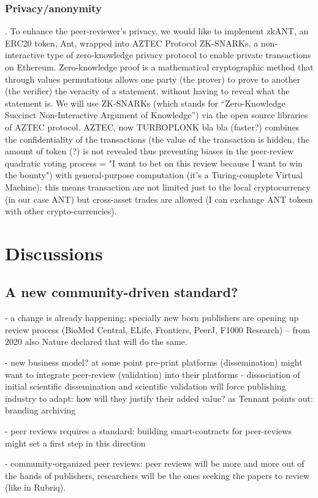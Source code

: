 \documentclass[runningheads]{llncs}
\begin{document}
\subsubsection{Privacy/anonymity}. To enhance the peer-reviewer's privacy, we would like to implement zkANT, an ERC20 token, Ant, wrapped into AZTEC Protocol ZK-SNARKs, a non-interactive type of zero-knowledge privacy protocol to enable private transactions on Ethereum. Zero-knowledge proof is a mathematical cryptographic method that through values permutations allows one party (the prover) to prove to another (the verifier) the veracity of a statement, without having to reveal what the statement is. We will use ZK-SNARKs (which stands for “Zero-Knowledge Succinct Non-Interactive Argument of Knowledge”) via the open source libraries of AZTEC protocol. AZTEC, now TURBOPLONK bla bla (faster?) combines the confidentiality of the transactions (the value of the transaction is hidden, the amount of token (?) is not revealed thus preventing biases in the peer-review quadratic voting process = "I want to bet on this review because I want to win the bounty") with general-purpose computation (it's a Turing-complete Virtual Machine): this means transaction are not limited just to the local cryptocurrency (in our case ANT) but cross-asset trades are allowed (I can exchange ANT tokesn with other crypto-currencies).
\section{Discussions}
\subsection{A new community-driven standard?}
- a change is already happening: specially new born publishers are opening up review process (BioMed Central, ELife, Frontiers, PeerJ, F1000 Research) -- from 2020 also Nature declared that will do the same.

- new business model? at some point pre-print platforms (dissemination) might want to integrate peer-review (validation) into their platforms - dissociation of initial scientific dissemination and scientific validation will force publishing industry to adapt: how will they justify their added value? as Tennant points out: branding archiving

- peer reviews requires a standard: building smart-contracts for peer-reviews might set a first step in this direction

- community-organized peer  reviews: peer reviews will be more and more out of the hands of publishers, researchers will be the ones seeking the papers to review (like in Rubriq).
\end{document}
